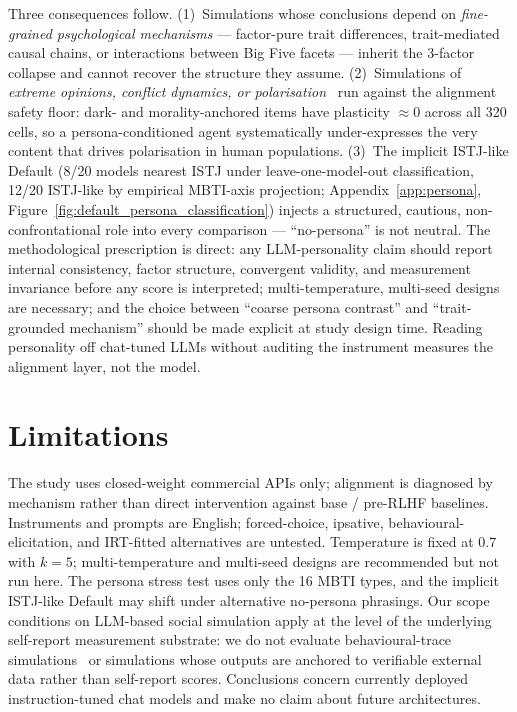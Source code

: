 \documentclass[11pt]{article}
\begin{document}
Three consequences follow. (1)~Simulations whose conclusions depend on \emph{fine-grained psychological mechanisms} --- factor-pure trait differences, trait-mediated causal chains, or interactions between Big Five facets --- inherit the 3-factor collapse and cannot recover the structure they assume. (2)~Simulations of \emph{extreme opinions, conflict dynamics, or polarisation}~\citep{chuang2025debate,cau2025language} run against the alignment safety floor: dark- and morality-anchored items have plasticity ${\approx}0$ across all 320 cells, so a persona-conditioned agent systematically under-expresses the very content that drives polarisation in human populations. (3)~The implicit ISTJ-like Default (8/20 models nearest ISTJ under leave-one-model-out classification, 12/20 ISTJ-like by empirical MBTI-axis projection; Appendix~\ref{app:persona}, Figure~\ref{fig:default_persona_classification}) injects a structured, cautious, non-confrontational role into every comparison --- ``no-persona'' is not neutral. The methodological prescription is direct: any LLM-personality claim should report internal consistency, factor structure, convergent validity, and measurement invariance before any score is interpreted; multi-temperature, multi-seed designs are necessary; and the choice between ``coarse persona contrast'' and ``trait-grounded mechanism'' should be made explicit at study design time. Reading personality off chat-tuned LLMs without auditing the instrument measures the alignment layer, not the model.


\section*{Limitations}
\label{sec:limitations}

The study uses closed-weight commercial APIs only; alignment is diagnosed by mechanism rather than direct intervention against base / pre-RLHF baselines. Instruments and prompts are English; forced-choice, ipsative, behavioural-elicitation, and IRT-fitted alternatives are untested. Temperature is fixed at $0.7$ with $k{=}5$; multi-temperature and multi-seed designs are recommended but not run here. The persona stress test uses only the 16 MBTI types, and the implicit ISTJ-like Default may shift under alternative no-persona phrasings. Our scope conditions on LLM-based social simulation apply at the level of the underlying self-report measurement substrate: we do not evaluate behavioural-trace simulations~\citep{park2023generative} or simulations whose outputs are anchored to verifiable external data rather than self-report scores. Conclusions concern currently deployed instruction-tuned chat models and make no claim about future architectures.
\end{document}

